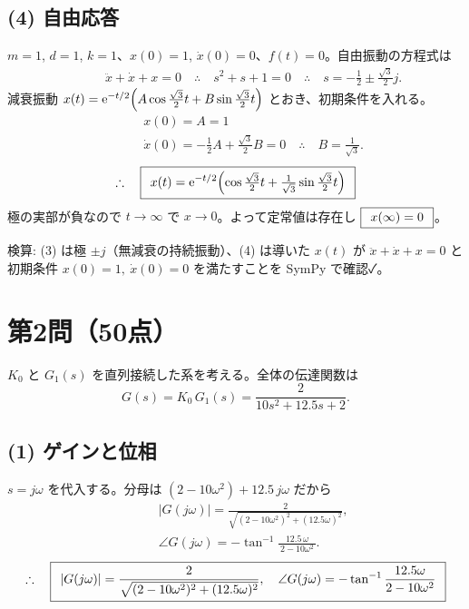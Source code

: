 \documentclass[11pt,a4paper]{article}
\begin{document}
\begin{center}
\end{center}

\subsection*{(4) 自由応答}
$m=1$, $d=1$, $k=1$、$x(0)=1$, $\dot{x}(0)=0$、$f(t)=0$。自由振動の方程式は
\begin{align*}
  &\qquad \ddot{x}+\dot{x}+x=0
   \quad\therefore\quad s^2+s+1=0
   \quad\therefore\quad s=-\frac12\pm\frac{\sqrt3}{2}j.
\end{align*}
減衰振動 $x(t)=\mathrm{e}^{-t/2}\!\left(A\cos\frac{\sqrt3}{2}t+B\sin\frac{\sqrt3}{2}t\right)$ とおき、初期条件を入れる。
\begin{align*}
  &\qquad x(0)=A=1\\
  &\qquad \dot{x}(0)=-\frac12A+\frac{\sqrt3}{2}B=0
   \quad\therefore\quad B=\frac{1}{\sqrt3}.
\end{align*}
\[
  \therefore\quad \boxed{\,\;x(t)=\mathrm{e}^{-t/2}\!\left(\cos\tfrac{\sqrt3}{2}t+\tfrac{1}{\sqrt3}\sin\tfrac{\sqrt3}{2}t\right)\;\,}
\]
極の実部が負なので $t\to\infty$ で $x\to0$。よって定常値は存在し $\boxed{\,\;x(\infty)=0\;\,}$。

\bigskip
\noindent 検算: (3) は極 $\pm j$（無減衰の持続振動）、(4) は導いた $x(t)$ が $\ddot x+\dot x+x=0$ と
初期条件 $x(0)=1,\ \dot x(0)=0$ を満たすことを SymPy で確認✓。

\newpage
\section*{第2問（50点）}

$K_0$ と $G_1(s)$ を直列接続した系を考える。全体の伝達関数は
\[
  G(s)=K_0\,G_1(s)=\frac{2}{10s^2+12.5s+2}.
\]

\subsection*{(1) ゲインと位相}
$s=j\omega$ を代入する。分母は $(2-10\omega^2)+12.5\,j\omega$ だから
\begin{align*}
  &\qquad |G(j\omega)|=\frac{2}{\sqrt{(2-10\omega^2)^2+(12.5\omega)^2}},\\
  &\qquad \angle G(j\omega)=-\tan^{-1}\!\frac{12.5\,\omega}{\,2-10\omega^2\,}.
\end{align*}
\[
  \therefore\quad \boxed{\,\;|G(j\omega)|=\dfrac{2}{\sqrt{(2-10\omega^2)^2+(12.5\omega)^2}},\quad
  \angle G(j\omega)=-\tan^{-1}\dfrac{12.5\omega}{2-10\omega^2}\;\,}
\]
\end{document}
